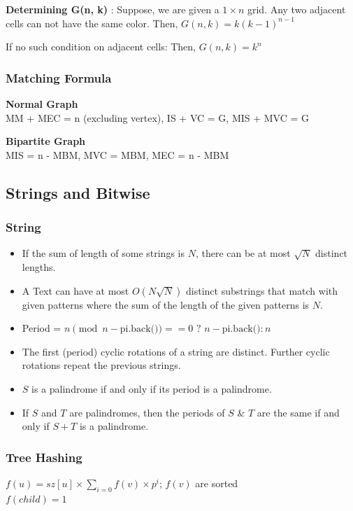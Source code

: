 \textbf{Determining G(n, k)} :
Suppose, we are given a $1 \times n$ grid. Any two adjacent cells can not have the same color.
Then, $G(n, k) = k (k-1)^{n-1}$

If no such condition on adjacent cells:
Then, $G(n, k) = k^n$

\subsubsection{Matching Formula}
\textbf{Normal Graph} \\
MM + MEC = n (excluding vertex), IS + VC = G, MIS + MVC = G

\textbf{Bipartite Graph} \\
MIS = n - MBM, MVC = MBM, MEC = n - MBM

\subsection{Strings and Bitwise}
\subsubsection{String}
\begin{itemize}
\item If the sum of length of some strings is $ N $, there can be at most $ \sqrt{N} $ distinct lengths.
\item A Text can have at most $ O(N \sqrt{N}) $ distinct substrings that match with given patterns where the sum of the length of the given patterns is $ N $.
\item Period =  $n \pmod{n - \text{pi.back()}} == 0 \text{ ? } n - \text{pi.back()} : n$
\item The first (period) cyclic rotations of a string are distinct. Further cyclic rotations repeat the previous strings.
\item $ S $ is a palindrome if and only if its period is a palindrome.
\item If $S$ and $T$ are palindromes, then the periods of $S$ \& $T$ are the same if and only if $S + T$ is a palindrome.
\end{itemize}

\subsubsection{Tree Hashing}
$ f(u) = sz[u] \times \sum_{i = 0} f(v) \times p^{i} $;    $ f(v) $ are sorted \\
$ f(child) = 1 $

